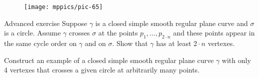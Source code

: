 \begin{figure}
\vskip0mm
\centering
\texttt{[image: mppics/pic-65]}
\vskip0mm
\end{figure}

\begin{thm}{Advanced exercise}\label{ex:curve-crosses-circle}
Suppose $\gamma$ is a closed simple smooth regular plane curve and $\sigma$ is a circle.
Assume $\gamma$ crosses $\sigma$ at the points $p_1,\dots,p_{2{\cdot} n}$ and these points appear in the same cycle order on $\gamma$ and on $\sigma$.
Show that $\gamma$ has at least $2\cdot n$ vertexes.

Construct an example of a closed simple smooth regular plane curve $\gamma$ with only 4 vertexes that crosses a given circle at arbitrarily many points. 
\end{thm}

